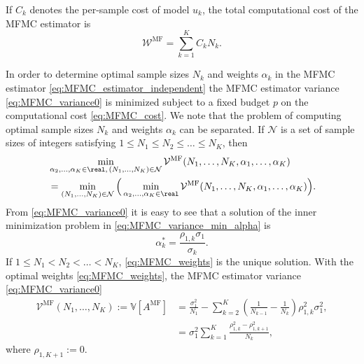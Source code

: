 If $C_k$ denotes the per-sample cost of model $u_k$, the total computational cost of the MFMC estimator  is 
\begin{equation}\label{eq:MFMC_cost}
        \mathcal{W}^{\text{MF}} = \sum_{k=1}^K C_k N_k.
\end{equation}



In order to determine optimal sample sizes $N_k$ and weights $\alpha_k$ in the MFMC estimator \eqref{eq:MFMC_estimator_independent} the MFMC estimator  variance \eqref{eq:MFMC_variance0} 
is minimized subject to a fixed budget $p$ on the computational cost \eqref{eq:MFMC_cost}.
We note that the problem of computing optimal sample sizes $N_k$ and weights $\alpha_k$ 
can be separated. 
If ${\mathcal N}$ is a set of sample sizes of integers satisfying $1 \le N_1 \le N_2 \le \ldots \le N_K$,
then
\begin{align}   \label{eq:MFMC_variance_min_alpha}
    & \min_{\alpha_2, \ldots, \alpha_K \in \real,\, (N_1, \ldots, N_K) \in {\mathcal N}} 
           \mathcal{V}^{\text{MF}}(N_1, \ldots, N_K, \alpha_1, \ldots, \alpha_K)                \nonumber \\
    & = \min_{(N_1, \ldots, N_K) \in {\mathcal N}} 
          \Big( \min_{\alpha_2, \ldots, \alpha_K \in \real} 
                       \mathcal{V}^{\text{MF}}(N_1, \ldots, N_K, \alpha_1, \ldots, \alpha_K)\Big).
\end{align}
From \eqref{eq:MFMC_variance0} it is easy to see that a solution of the  inner minimization problem in
\eqref{eq:MFMC_variance_min_alpha} is
\begin{equation}   \label{eq:MFMC_weights}
    \alpha_k^* = \frac{\rho_{1,k}\sigma_1}{\sigma_k}.
\end{equation}
If $1 \le N_1 < N_2 < \ldots < N_K$, \eqref{eq:MFMC_weights} is the unique solution.
With the optimal weights \eqref{eq:MFMC_weights}, the MFMC estimator  variance \eqref{eq:MFMC_variance0} 
\begin{subequations}  \label{eq:MFMC_variance}
\begin{align}
    \mathcal{V}^{\text{MF}}(N_1, \ldots, N_K)
    :=  \mathbb{V}[A^{\text{MF}}]
   & = \frac{\sigma_1^2}{N_1} 
       - \sum_{k=2}^K \left(\frac{1}{N_{k-1}} - \frac{1}{N_k}\right) \rho_{1,k}^2 \sigma_1^2,   \label{eq:MFMC_variance_a} \\
   &= \sigma_1^2\sum_{k=1}^K \frac{ \rho_{1,k}^2 - \rho_{1,k+1}^2}{N_k},           \label{eq:MFMC_variance_b}
\end{align}
\end{subequations}
where $\rho_{1,K+1} :=0$. 

